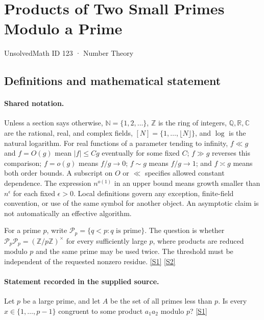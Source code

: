 \documentclass[11pt,a4paper]{article}
\newcommand{\N}{\mathbb{N}}
\newcommand{\Z}{\mathbb{Z}}
\newcommand{\Q}{\mathbb{Q}}
\newcommand{\R}{\mathbb{R}}
\newcommand{\C}{\mathbb{C}}
\newcommand{\sref}[2]{\hyperlink{source:#1:#2}{[S#2]}}
\begin{document}

\setcounter{section}{122}

\section{Products of Two Small Primes Modulo a Prime}\label{123}

{\small\sffamily UnsolvedMath ID 123 · Number Theory}

\subsection{Definitions and mathematical statement}

\paragraph{Shared notation.}Unless a section says otherwise, $\N=\{1,2,\ldots\}$,
$\Z$ is the ring of integers, $\Q,\R,\C$ are the rational, real, and complex
fields, $[N]=\{1,\ldots,\lfloor N\rfloor\}$, and $\log$ is the natural
logarithm. For real functions of a parameter tending to infinity,
$f\ll g$ and $f=O(g)$ mean $|f|\leq Cg$ eventually for some fixed $C$;
$f\gg g$ reverses this comparison; $f=o(g)$ means $f/g\to0$;
$f\sim g$ means $f/g\to1$; and $f\asymp g$ means both order bounds.
A subscript on $O$ or $\ll$ specifies allowed constant dependence.
The expression $n^{o(1)}$ in an upper bound means growth smaller than
$n^\epsilon$ for each fixed $\epsilon>0$. Local definitions govern any
exception, finite-field convention, or use of the same symbol for another
object. An asymptotic claim is not automatically an effective algorithm.



For a prime $p$, write $\mathcal P_p=\{q<p:q\text{ is prime}\}$. The question is whether $\mathcal P_p\mathcal P_p=(\Z/p\Z)^\times$ for every sufficiently large $p$, where products are reduced modulo $p$ and the same prime may be used twice. The threshold must be independent of the requested nonzero residue. \sref{123}{1} \sref{123}{2}

\paragraph{Statement recorded in the supplied source.}
Let $p$ be a large prime, and let $A$ be the set of all primes less than $p$. Is every $x \in \{1, \dots, p-1\}$ congruent to some product $a_1a_2$ modulo $p$? \sref{123}{1}
\end{document}
